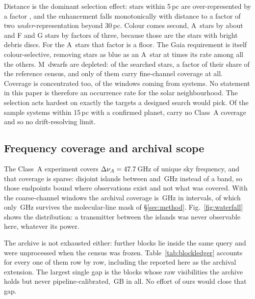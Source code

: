 Distance is the dominant selection effect: stars within 5\,pc are
over-represented by a factor \SfTopRatio, and the enhancement falls
monotonically with distance to a factor of two \emph{under}-representation
beyond 30\,pc. Colour comes second, A~stars by about \SfARatio{} and F and G
stars by factors of three, because those are the stars with bright debris
discs. For the A~stars that factor is a floor. The Gaia requirement is itself
colour-selective, removing stars as blue as an A~star at \BsEarlyRatio{} times
its rate among all the others. M~dwarfs are depleted:
\SfMSearched{} of the \SfNStar{} searched stars, a factor \SfMRatio{} of their
share of the reference census, and only \SfMClassAStars{} of them carry
fine-channel coverage at all. Coverage is concentrated too, \ConcThreeWin{} of
the \NWindows{} windows coming from \ConcThreeSys{} systems. No statement in
this paper is therefore an occurrence rate for the solar neighbourhood. The
selection acts hardest on exactly the targets a designed search would pick. Of
the \CsIntNRow{} sample systems within 15\,pc with a confirmed planet,
\CsIntNoClassA{} carry no Class~A coverage and so no drift-resolving limit.




\subsection{Frequency coverage and archival scope}
\label{sec:coverage}

The Class~A experiment covers $\Delta\nu_A=47.7$\,GHz of unique sky frequency,
and that coverage is sparse: \DomAIslands{} disjoint islands between
\DomAFreqLo{} and \DomAFreqHi\,GHz instead of a band, so those endpoints bound
where observations exist and not what was covered. With the coarse-channel
windows the archival coverage is \DnuAB\,GHz in \UnionIntervals{} intervals, of
which only \SearchedUnionGHz\,GHz survives the molecular-line mask of
\S\ref{sec:method}. Fig.~\ref{fig:waterfall} shows the distribution: a
transmitter between the islands was never observable here, whatever its power.

The archive is not exhausted either: \LdgExtScope{} further blocks lie inside
the same query and were unprocessed when the census was frozen.
Table~\ref{tab:blockledger} accounts for every one of them row by row,
including the \LdgExtEB{} reported here as the archival extension. The
largest single gap is the \FateNoCal{} blocks whose raw visibilities the
archive holds but never pipeline-calibrated, \FateNoCalGB\,GB in all. No
effort of ours would close that gap.

